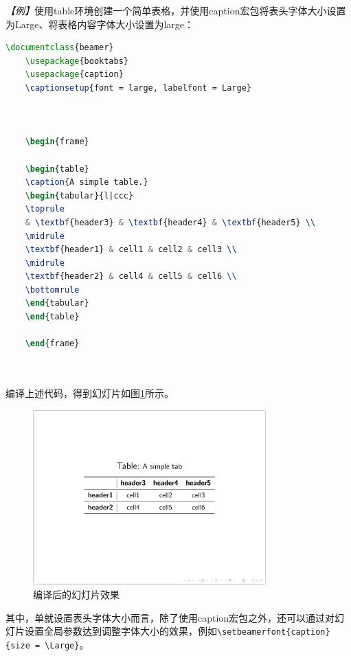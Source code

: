 \emph{【例】}使用table环境创建一个简单表格，并使用caption宏包将表头字体大小设置为Large、将表格内容字体大小设置为large：
\begin{lstlisting}[language=TeX]
    \documentclass{beamer}
    \usepackage{booktabs}
    \usepackage{caption}
    \captionsetup{font = large, labelfont = Large}

    

    \begin{frame}

    \begin{table}
    \caption{A simple table.}
    \begin{tabular}{l|ccc}
    \toprule
    & \textbf{header3} & \textbf{header4} & \textbf{header5} \\
    \midrule
    \textbf{header1} & cell1 & cell2 & cell3 \\
    \midrule
    \textbf{header2} & cell4 & cell5 & cell6 \\
    \bottomrule
    \end{tabular}
    \end{table}

    \end{frame}

    
\end{lstlisting}

编译上述代码，得到幻灯片如图\ref{fig:932}所示。

\begin{figure}[htbp]
    \centering
    \includegraphics[width = 0.8\textwidth]{images/ch_9/example_sec2_5.png}
    \caption{编译后的幻灯片效果}
    \label{fig:932}
\end{figure}

其中，单就设置表头字体大小而言，除了使用caption宏包之外，还可以通过对幻灯片设置全局参数达到调整字体大小的效果，例如\texttt{\textbackslash{}setbeamerfont\{caption\}\{size = \textbackslash{}Large\}}。

